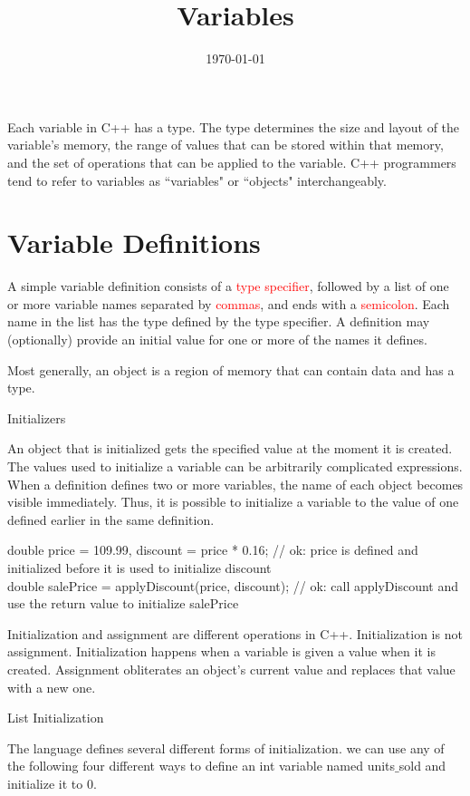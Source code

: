 \documentclass[12pt,a4paper]{article}
\title{Variables}
\author{}
\date{\today}
\begin{document}
\maketitle
Each variable in C++ has a type. The type determines the size and layout of the variable’s memory, the range of values that can be stored within that memory, and the set of operations that can be applied to the variable. C++ programmers tend to refer to variables as ``variables" or ``objects" interchangeably.

\section{Variable Definitions}
A simple variable definition consists of a \textcolor{red}{type specifier}, followed by a list of one or more variable names separated by \textcolor{red}{commas}, and ends with a \textcolor{red}{semicolon}. Each name in the list has the type defined by the type specifier. A definition may (optionally) provide an initial value for one or more of the names it defines.

Most generally, an object is a region of memory that can contain data and has a type.

Initializers

An object that is initialized gets the specified value at the moment it is created. The values used to initialize a variable can be arbitrarily complicated expressions. When a definition defines two or more variables, the name of each object becomes visible immediately. Thus, it is possible to initialize a variable to the value of one defined earlier in the same definition.

double price = 109.99, discount = price * 0.16; // ok: price is defined and initialized before it is used to initialize discount \\
double salePrice = applyDiscount(price, discount); // ok: call applyDiscount and use the return value to initialize salePrice

Initialization and assignment are different operations in C++. Initialization is not assignment. Initialization happens when a variable is given a value when it is created. Assignment obliterates an object’s current value and replaces that value with a new one.

List Initialization

The language defines several different forms of initialization. we can use any of the following four different ways to define an int variable named units$\_$sold and initialize it to 0.
\end{document}
